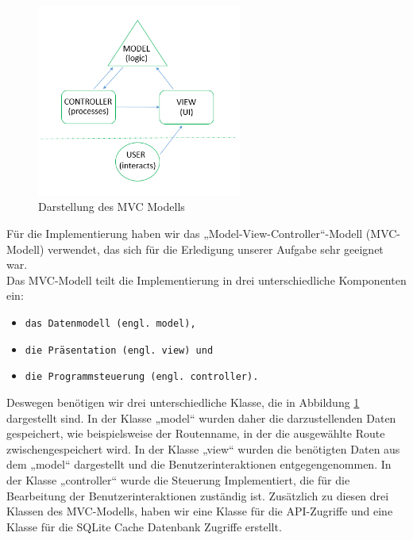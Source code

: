 \documentclass[12pt,a4paper,ngerman,english]{report}
\begin{document}
\begin{figure}[h]
  \centering
  \includegraphics[width=0.6\textwidth]{img/mvc.png}
  \caption{Darstellung des MVC Modells}
  \label{fig:MVC}
\end{figure}

Für die Implementierung haben wir das „Model-View-Controller“-Modell (MVC-Modell) verwendet, das sich für die Erledigung unserer Aufgabe sehr geeignet war.\\
Das MVC-Modell teilt die Implementierung in drei unterschiedliche Komponenten ein:	
\begin{itemize}
	\setlength\itemsep{0.1em}
	\item \texttt{das Datenmodell (engl. model),}
	\item \texttt{die Präsentation (engl. view) und}
	\item \texttt{die Programmsteuerung (engl. controller).}
\end{itemize}
\newpage
Deswegen benötigen wir drei unterschiedliche Klasse, die in Abbildung \ref{fig:MVC} dargestellt sind. In der Klasse „model“ wurden daher die darzustellenden Daten gespeichert, wie beispielsweise der Routenname, in der die ausgewählte Route zwischengespeichert wird. In der Klasse „view“ wurden die benötigten Daten aus dem „model“ dargestellt und die Benutzerinteraktionen entgegengenommen. In der Klasse „controller“ wurde die Steuerung Implementiert, die für die Bearbeitung der Benutzerinteraktionen zuständig ist. Zusätzlich zu diesen drei Klassen des MVC-Modells, haben wir eine Klasse für die API-Zugriffe und eine Klasse für die SQLite Cache Datenbank Zugriffe erstellt.
\end{document}
